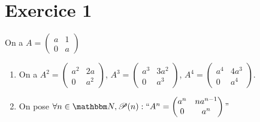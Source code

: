 \part{Exercice 1}

On a $A = \begin{pmatrix}
	a&1\\
	0&a
\end{pmatrix}$ 

\begin{enumerate}
	\item
		On a $A^2 = \begin{pmatrix}
			a^2&2a\\
			0&a^2
		\end{pmatrix}$, $A^3 = \begin{pmatrix}
			a^3&3a^2\\
			0&a^3
		\end{pmatrix}$, $A^4 = \begin{pmatrix}
			a^4&4a^3\\
			0&a^4
		\end{pmatrix}$.
	\item On pose $\forall n \in \N, \mathcal{P}(n): ``A^n = \begin{pmatrix}
			a^n&na^{n-1}\\
			0&a^n
		\end{pmatrix}"$ \\


\end{enumerate}
